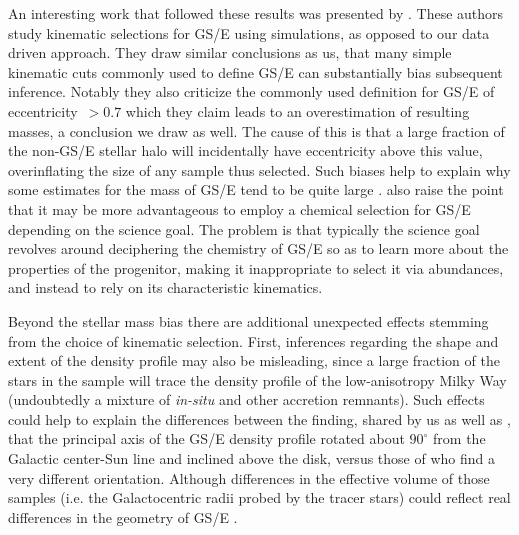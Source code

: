 An interesting work that followed these results was presented by \textcite{carrillo23}. These authors study kinematic selections for GS/E using simulations, as opposed to our data driven approach. They draw similar conclusions as us, that many simple kinematic cuts commonly used to define GS/E can substantially bias subsequent inference. Notably they also criticize the commonly used definition for GS/E of eccentricity~$> 0.7$ which they claim leads to an overestimation of resulting masses, a conclusion we draw as well. The cause of this is that a large fraction of the non-GS/E stellar halo will incidentally have eccentricity above this value, overinflating the size of any sample thus selected. Such biases help to explain why some estimates for the mass of GS/E tend to be quite large \parencite[e.g.][, who use this eccentricity cut to define GS/E]{han22}. \textcite{carrillo23} also raise the point that it may be more advantageous to employ a chemical selection for GS/E depending on the science goal. The problem is that typically the science goal revolves around deciphering the chemistry of GS/E so as to learn more about the properties of the progenitor, making it inappropriate to select it via abundances, and instead to rely on its characteristic kinematics.

Beyond the stellar mass bias there are additional unexpected effects stemming from the choice of kinematic selection. First, inferences regarding the shape and extent of the density profile may also be misleading, since a large fraction of the stars in the sample will trace the density profile of the low-anisotropy Milky Way (undoubtedly a mixture of \textit{in-situ} and other accretion remnants). Such effects could help to explain the differences between the finding, shared by us as well as \textcite{iorio21}, that the principal axis of the GS/E density profile rotated about $90^\circ$ from the Galactic center-Sun line and inclined above the disk, versus those of \textcite{han22} who find a very different orientation. Although differences in the effective volume of those samples (i.e. the Galactocentric radii probed by the tracer stars) could reflect real differences in the geometry of GS/E \parencite[see][ for an example of this in the outer halo]{chandra23}. 

